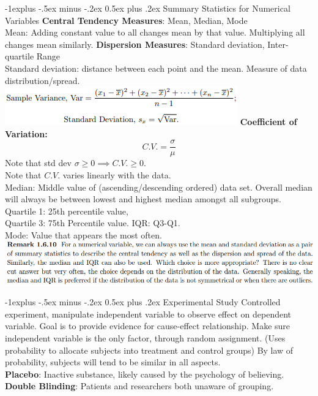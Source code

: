 \documentclass[10pt, landscape]{article}
\makeatletter
\renewcommand{\subsection}{\@startsection{subsection}{2}{0mm}%
                                {-1explus -.5ex minus -.2ex}%
                                {0.5ex plus .2ex}%
                                {\normalfont\normalsize\bfseries}}
\makeatother
\begin{document}
\begin{multicols*}{3}
\subsection{Summary Statistics for Numerical Variables}
	\textbf{Central Tendency Measures}: Mean, Median, Mode \\
	Mean: Adding constant value to all changes mean by that value. Multiplying all changes mean similarly.
	\textbf{Dispersion Measures}: Standard deviation, Inter-quartile Range\\
	Standard deviation: distance between each point and the mean. Measure of data distribution/spread.
	\includegraphics[width = \linewidth]{variance}
	\textbf{Coefficient of Variation: }
    \begin{equation*}
        C.V. = \frac{\sigma}{\mu}
    \end{equation*}
    Note that std dev $\sigma \geq 0 \implies C.V. \geq 0$. \\
    Note that $C.V.$ varies linearly with the data. \\
    
    \vspace{5 pt}
	Median: Middle value of (ascending/descending ordered) data set. Overall median will always be between lowest and highest median amongst all subgroups.\\
	Quartile 1: 25th percentile value, \\
	Quartile 3: 75th Percentile value. IQR: Q3-Q1.\\
	Mode: Value that appears the most often.
	\includegraphics[width = \linewidth]{meanmediancomment}

\subsection{Experimental Study}
	Controlled experiment, manipulate independent variable to observe effect on dependent variable. Goal is to provide evidence for cause-effect relationship. Make sure independent variable is the only factor, through random assignment. (Uses probability to allocate subjects into treatment and control groups) By law of probability, subjects will tend to be similar in all aspects. \\
	\textbf{Placebo}: Inactive substance, likely caused by the psychology of believing. \\
	\textbf{Double Blinding}: Patients and researchers both unaware of grouping. \\


\end{multicols*}
\end{document}
